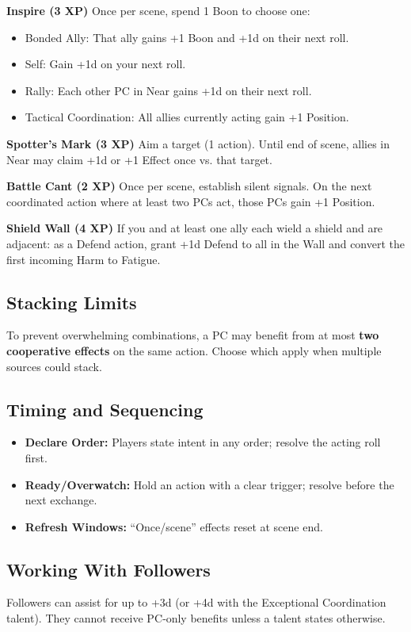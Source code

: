 \textbf{Inspire (3 XP)} Once per scene, spend 1 Boon to choose one:
\begin{itemize}
  \item Bonded Ally: That ally gains +1 Boon and +1d on their next roll.
  \item Self: Gain +1d on your next roll.
  \item Rally: Each other PC in Near gains +1d on their next roll.
  \item Tactical Coordination: All allies currently acting gain +1 Position.
\end{itemize}

\textbf{Spotter's Mark (3 XP)} Aim a target (1 action). Until end of scene, allies in Near may claim +1d or +1 Effect once vs. that target.

\textbf{Battle Cant (2 XP)} Once per scene, establish silent signals. On the next coordinated action where at least two PCs act, those PCs gain +1 Position.

\textbf{Shield Wall (4 XP)} If you and at least one ally each wield a shield and are adjacent: as a Defend action, grant +1d Defend to all in the Wall and convert the first incoming Harm to Fatigue.

\subsection{Stacking Limits}
To prevent overwhelming combinations, a PC may benefit from at most \textbf{two cooperative effects} on the same action. Choose which apply when multiple sources could stack.

\subsection{Timing and Sequencing}
\begin{itemize}
  \item \textbf{Declare Order:} Players state intent in any order; resolve the acting roll first.
  \item \textbf{Ready/Overwatch:} Hold an action with a clear trigger; resolve before the next exchange.
  \item \textbf{Refresh Windows:} “Once/scene” effects reset at scene end.
\end{itemize}

\subsection{Working With Followers}
Followers can assist for up to +3d (or +4d with the Exceptional Coordination talent). They cannot receive PC‑only benefits unless a talent states otherwise.

